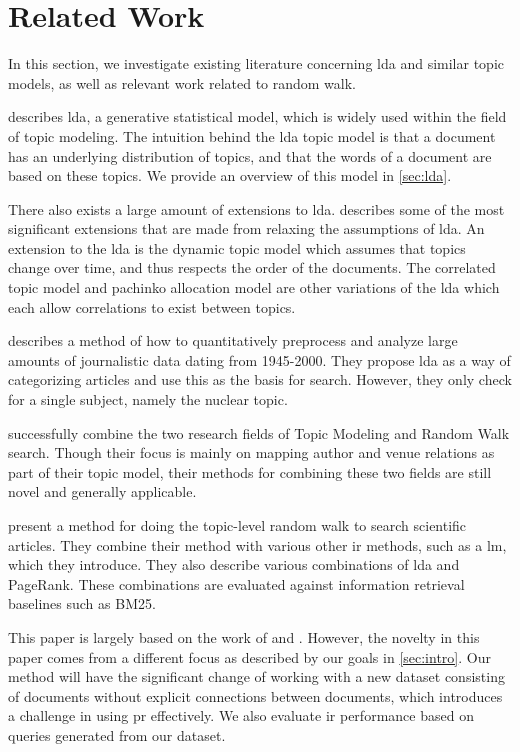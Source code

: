 \section{Related Work}\label{sec:related-works}
In this section, we investigate existing literature concerning \gls{lda} and similar topic models, as well as relevant work related to random walk.

\citet{lda} describes \acrlong{lda}, a generative statistical model, which is widely used within the field of topic modeling. 
The intuition behind the \gls{lda} topic model is that a document has an underlying distribution of topics, and that the words of a document are based on these topics.
We provide an overview of this model in \autoref{sec:lda}.

There also exists a large amount of extensions to \gls{lda}.
\citet{blei2012topicmodels} describes some of the most significant extensions that are made from relaxing the assumptions of \gls{lda}.
An extension to the \gls{lda} is the dynamic topic model\cite{blei2006dynamic} which assumes that topics change over time, and thus respects the order of the documents. 
The correlated topic model\cite{blei2007correlated} and pachinko allocation model\cite{li2006pachinko} are other variations of the \gls{lda} which each allow correlations to exist between topics.


\citet{quanti} describes a method of how to quantitatively preprocess and analyze large amounts of journalistic data dating from 1945-2000. 
They propose \gls{lda} as a way of categorizing articles and use this as the basis for search.
However, they only check for a single subject, namely the nuclear topic.  


\citet{Tang2008} successfully combine the two research fields of Topic Modeling and Random Walk search. 
Though their focus is mainly on mapping author and venue relations as part of their topic model, their methods for combining these two fields are still novel and generally applicable.


\citet{yang2009topic} present a method for doing the topic-level random walk to search scientific articles.
They combine their method with various other \gls{ir} methods, such as a \gls{lm}, which they introduce.
They also describe various combinations of \gls{lda} and PageRank.
These combinations are evaluated against information retrieval baselines such as BM25\cite{bm251996}.


This paper is largely based on the work of \citeauthor{yang2009topic}\cite{yang2009topic} and \citeauthor{Tang2008}\cite{Tang2008}.
However, the novelty in this paper comes from a different focus as described by our goals in \autoref{sec:intro}.
Our method will have the significant change of working with a new dataset consisting of documents without explicit connections between documents, which introduces a challenge in using \gls{pr} effectively.
We also evaluate \gls{ir} performance based on queries generated from our dataset.

